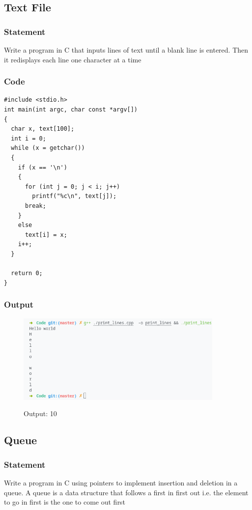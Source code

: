 \pagebreak
\subsection{Text File}
\subsubsection{Statement}
Write a program in C that inputs lines of text until a blank line is entered. Then it redisplays
each line one character at a time
\subsubsection{Code}
\begin{verbatim} 
#include <stdio.h>
int main(int argc, char const *argv[])
{
  char x, text[100];
  int i = 0;
  while (x = getchar())
  {
    if (x == '\n')
    {
      for (int j = 0; j < i; j++)
        printf("%c\n", text[j]);
      break;
    }
    else
      text[i] = x;
    i++;
  }

  return 0;
}

\end{verbatim}
\subsubsection{Output}
\begin{figure}[!htb]
  \centering
  \includegraphics[width=4in]{Images/print_lines.png}
  \label{output:10}
  \caption{Output: 10}
\end{figure}

\pagebreak
\subsection{Queue}
\subsubsection{Statement}
Write a program in C using pointers to implement insertion and deletion in a queue. A queue
is a data structure that follows a first in first out i.e. the element to go in first is the one to come
out first
